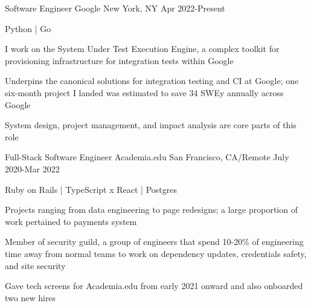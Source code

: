 

\begin{cventries}

  \cventry
    {Software Engineer}
    {Google}
    {New York, NY}
    {Apr 2022-Present}
    {
      \begin{cvitems}
        \item {Python | Go}
        \item {
          I work on the System Under Test Execution Engine, a complex toolkit for
          provisioning infrastructure for integration tests within Google
        }
        \item {
          Underpins the canonical solutions for integration testing and CI at Google;
          one six-month project I landed was estimated to save 34 SWEy annually across Google
        }
        \item {
          System design, project management, and impact analysis are core parts of this role
        }
      \end{cvitems}
    }

  \cventry
    {Full-Stack Software Engineer}
    {Academia.edu}
    {San Francisco, CA/Remote}
    {July 2020-Mar 2022}
    {
      \begin{cvitems}
        \item {Ruby on Rails | TypeScript x React | Postgres}
        \item {
          Projects ranging from data engineering to page redesigns;
          a large proportion of work pertained to payments system
        }
        \item {
          Member of security guild, a group of engineers that spend 10-20\% of
          engineering time away from normal teams to work on dependency updates,
          credentials safety, and site security
        }
        \item {
          Gave tech screens for Academia.edu from early 2021 onward and also
          onboarded two new hires
        }
      \end{cvitems}
    }


\end{cventries}
